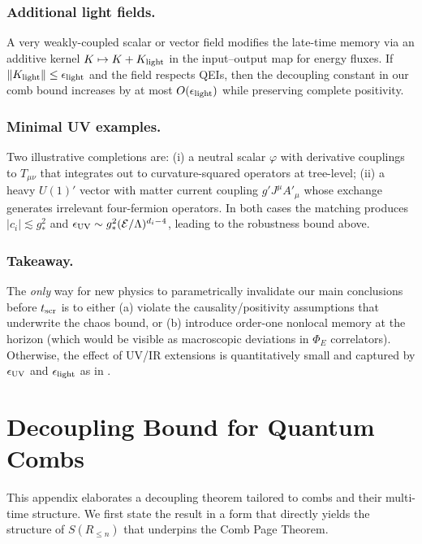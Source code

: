 \documentclass[11pt,a4paper]{article}
\newcommand{\Eflux}{\Phi_E}
\theoremstyle{plain}
\theoremstyle{definition}
\theoremstyle{remark}
\begin{document}
\subsubsection{Additional light fields.} A very weakly-coupled scalar or vector field modifies the late-time memory via an additive kernel $K\mapsto K+K_{\rm light}$ in the input--output map for energy fluxes. If $\|K_{\rm light}\|\le \epsilon_{\rm light}$ and the field respects QEIs, then the decoupling constant in our comb bound increases by at most $O(\epsilon_{\rm light})$ while preserving complete positivity.

\subsubsection{Minimal UV examples.} Two illustrative completions are: (i) a neutral scalar $\varphi$ with derivative couplings to $T_{\mu\nu}$ that integrates out to curvature-squared operators at tree-level; (ii) a heavy $U(1)'$ vector with matter current coupling $g' J^\mu A'_\mu$ whose exchange generates irrelevant four-fermion operators. In both cases the matching produces $|c_i|\lesssim g_\ast^2$ and $\epsilon_{\rm UV}\sim g_\ast^2(\mathcal{E}/\Lambda)^{d_i-4}$, leading to the robustness bound above.

\subsubsection{Takeaway.} The \emph{only} way for new physics to parametrically invalidate our main conclusions before $t_{\rm scr}$ is to either (a) violate the causality/positivity assumptions that underwrite the chaos bound, or (b) introduce order-one nonlocal memory at the horizon (which would be visible as macroscopic deviations in $\Eflux$ correlators). Otherwise, the effect of UV/IR extensions is quantitatively small and captured by $\epsilon_{\rm UV}$ and $\epsilon_{\rm light}$ as in .


\appendix

\section{Decoupling Bound for Quantum Combs}
\label{app:decoupling}
This appendix elaborates a decoupling theorem tailored to combs and their multi-time structure. We first state the result in a form that directly yields the structure of $S(R_{\le n})$ that underpins the Comb Page Theorem.
\end{document}

